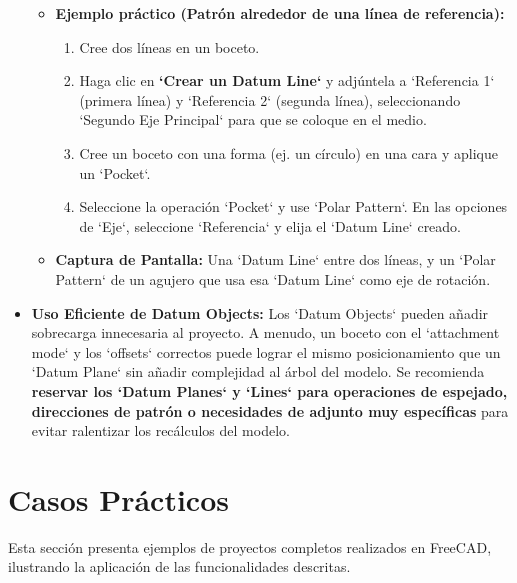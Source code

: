 \documentclass[12pt]{article}
\begin{document}
\begin{itemize}[label=\textbullet]
\begin{itemize}[label=\textendash]
        \item \textbf{Ejemplo práctico (Patrón alrededor de una línea de referencia):}
        \begin{enumerate}[label=\arabic*)]
            \item Cree dos líneas en un boceto.
            \item Haga clic en \textbf{`Crear un Datum Line`} y adjúntela a `Referencia 1` (primera línea) y `Referencia 2` (segunda línea), seleccionando `Segundo Eje Principal` para que se coloque en el medio.
            \item Cree un boceto con una forma (ej. un círculo) en una cara y aplique un `Pocket`.
            \item Seleccione la operación `Pocket` y use `Polar Pattern`. En las opciones de `Eje`, seleccione `Referencia` y elija el `Datum Line` creado.
        \end{enumerate}
        \item \textbf{Captura de Pantalla:} Una `Datum Line` entre dos líneas, y un `Polar Pattern` de un agujero que usa esa `Datum Line` como eje de rotación.
    \end{itemize}
    \item \textbf{Uso Eficiente de Datum Objects:} Los `Datum Objects` pueden añadir sobrecarga innecesaria al proyecto. A menudo, un boceto con el `attachment mode` y los `offsets` correctos puede lograr el mismo posicionamiento que un `Datum Plane` sin añadir complejidad al árbol del modelo. Se recomienda \textbf{reservar los `Datum Planes` y `Lines` para operaciones de espejado, direcciones de patrón o necesidades de adjunto muy específicas} para evitar ralentizar los recálculos del modelo.
\end{itemize}
\newpage

\section{Casos Prácticos}
Esta sección presenta ejemplos de proyectos completos realizados en FreeCAD, ilustrando la aplicación de las funcionalidades descritas.
\end{document}

